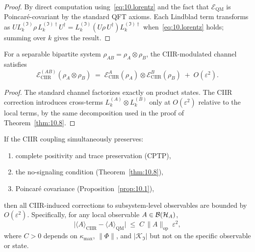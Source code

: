 \begin{proof}
By direct computation using~\eqref{eq:10.lorentz} and the fact that
$\mathcal{E}_{\mathrm{QM}}$ is Poincar\'e-covariant by the standard
QFT axioms.  Each Lindblad term transforms as
$U L_k^{(\mathfrak{I})}\rho\,L_k^{(\mathfrak{I})\dagger}U^{\dagger}
= L_k^{(\mathfrak{I})}(U\rho\,U^{\dagger})L_k^{(\mathfrak{I})\dagger}$
when~\eqref{eq:10.lorentz} holds; summing over $k$ gives the result.
\end{proof}

\begin{theorem}
\label{thm:10.10}
For a separable bipartite system
$\rho_{AB}=\rho_A\otimes\rho_B$, the CIIR-modulated channel satisfies
\begin{equation}
\label{eq:10.composition}
  \mathcal{E}_{\mathrm{CIIR}}^{(AB)}(\rho_A\otimes\rho_B)
  \;=\;
  \mathcal{E}_{\mathrm{CIIR}}^{A}(\rho_A)
  \otimes
  \mathcal{E}_{\mathrm{CIIR}}^{B}(\rho_B)
  \;+\;
  O(\varepsilon^2).
\end{equation}
\end{theorem}

\begin{proof}
The standard channel factorizes exactly on product states.  The CIIR
correction introduces cross-terms
$L_k^{(A)}\otimes L_k^{(B)}$ only at $O(\varepsilon^2)$ relative to
the local terms, by the same decomposition used in the proof of
Theorem~\ref{thm:10.8}.
\end{proof}

\begin{theorem}
\label{thm:10.11}
If the CIIR coupling simultaneously preserves:
\begin{enumerate}
  \item[(i)]   complete positivity and trace preservation (CPTP),
  \item[(ii)]  the no-signaling condition
               (Theorem~\ref{thm:10.8}),
  \item[(iii)] Poincar\'e covariance
               (Proposition~\ref{prop:10.1}),
\end{enumerate}
then all CIIR-induced corrections to subsystem-level observables are
bounded by $O(\varepsilon^2)$.  Specifically, for any local observable
$A\in\mathcal{B}(\mathcal{H}_A)$,
\begin{equation}
\label{eq:10.nogo}
  \bigl|\langle A\rangle_{\mathrm{CIIR}}
        - \langle A\rangle_{\mathrm{QM}}\bigr|
  \;\leq\;
  C\,\|A\|_{\mathrm{op}}\;\varepsilon^2,
\end{equation}
where $C>0$ depends on
$\kappa_{\max}$, $\|\Phi\|$, and $|\mathcal{K}_{\mathfrak{I}}|$ but
not on the specific observable or state.
\end{theorem}


